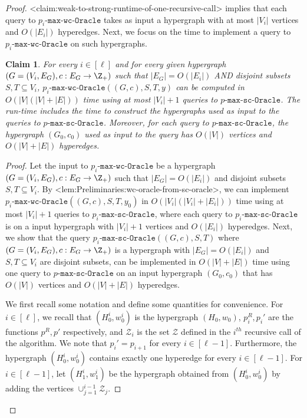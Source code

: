 \documentclass{article}
\def\Cref#1{<#1>}%
\newtheorem{claim}{Claim}[section]
\newcommand{\zeros}{\ensuremath{\mathcal{Z}}\xspace}
\newcommand{\functionMaximizationOracle}[1]{\ensuremath{{#1}\text{-}\mathtt{max}\text{-}\mathtt{wc}\text{-}\mathtt{Oracle}}\xspace}
\newcommand{\functionMaximizationOracleStrongCover}[1]{\ensuremath{{#1}\text{-}\mathtt{max}\text{-}\mathtt{sc}\text{-}\mathtt{Oracle}}\xspace}
\begin{document}
\begin{proof}
\Cref{claim:weak-to-strong-runtime-of-one-recursive-call} implies that each query to \functionMaximizationOracle{p_i} takes as input a hypergraph 
with at most $|V_i|$ vertices and $O(|E_i|)$ hyperedges.  
Next, we focus on the time to implement a query to \functionMaximizationOracle{p_i} on such hypergraphs. 

\begin{claim}\label{claim:WeakToStrong:p_i-oracle-using-p-oracle}
For every $i\in [\ell]$ and for every given hypergraph $(G = (V_i, E_G), c:E_G\rightarrow\Z_+)$ such that $|E_G| = O(|E_i|)$ AND disjoint subsets $S, T\subseteq V_i$, $\functionMaximizationOracle{p_i}((G, c), S, T, y)$ can be computed in $O(|V|(|V| + |E|))$ time using at most $|V_i|+1$ queries to \functionMaximizationOracleStrongCover{p}. The run-time includes the time to construct the hypergraphs used as input to the queries to \functionMaximizationOracleStrongCover{p}. Moreover, for each query to \functionMaximizationOracleStrongCover{p}, the hypergraph $(G_0, c_0)$ used as input to the query has $O(|V|)$ vertices and $O(|V|+|E|)$ hyperedges.
\end{claim}
\begin{proof}
Let the input to \functionMaximizationOracle{p_i} be a hypergraph $(G = (V_i, E_G), c:E_G\rightarrow\Z_+)$ such that $|E_G| = O(|E_i|)$ and disjoint subsets $S, T\subseteq V_i$. By \Cref{lem:Preliminaries:wc-oracle-from-sc-oracle}, we can implement $\functionMaximizationOracle{p_i}((G, c), S, T, y_0)$ in $O(|V_i|(|V_i| + |E_i|))$ time using at most $|V_i|+1$ queries to $\functionMaximizationOracleStrongCover{p_i}$, where each query to $\functionMaximizationOracleStrongCover{p_i}$ is on a input hypergraph with $|V_i|+1$ vertices and $O(|E_i|)$ hyperedges. Next, we show that the query $\functionMaximizationOracleStrongCover{p_i}((G, c), S, T)$ where $(G = (V_i, E_G), c:E_G\rightarrow\Z_+)$ is a hypergraph with $|E_G| = O(|E_i|)$ and $S, T\subseteq V_i$ are disjoint subsets, can be implemented in $O(|V| + |E|)$ time using one query to  $\functionMaximizationOracleStrongCover{p}$ on an input hypergraph $(G_0, c_0)$ that has $O(|V|)$ vertices and $O(|V|+|E|)$ hyperedges. 

We first recall some notation and define some quantities for convenience. For $i\in [\ell]$, we recall that $(H_0^i, w_0^i)$ is the hypergraph $(H_0, w_0)$, $p^R_i, p_i'$ are the functions $p^R, p'$ respectively, and $\zeros_i$ is the set $\zeros$ defined in the $i^{th}$ recursive call of the algorithm. We note that $p_i' =p_{i+1}$ for every $i\in [\ell-1]$. Furthermore, the hypergraph $(H_0^i, w_0^i)$ contains exactly one hyperedge for every $i\in [\ell-1]$. 
For $i\in [\ell-1]$, let $(H_1^i, w_1^i)$ be the hypergraph obtained from $(H_0^i, w_0^i)$ by adding the vertices $\cup_{j=1}^{i-1}\zeros_{j}$.


\end{proof}
\end{proof}
\end{document}
